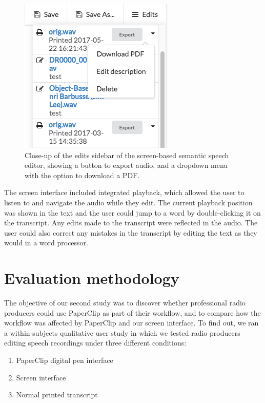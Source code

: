 \begin{figure}
  \centering
  \includegraphics[width=0.4\columnwidth]{figs/discourse-download-pdf.png}
  \caption[Close-up of the edits sidebar of the screen-based semantic speech editor.]{Close-up of the edits sidebar of
  the screen-based semantic speech editor, showing a button to export audio, and a dropdown menu with the option to
download a PDF.}
  \label{fig:download-pdf}
\end{figure}


The screen interface included integrated playback, which allowed the user to listen to and navigate the audio while
they edit. The current playback position was shown in the text and the user could jump to a word by double-clicking it
on the transcript. Any edits made to the transcript were reflected in the audio.  The user could also correct any
mistakes in the transcript by editing the text as they would in a word processor.









\section{Evaluation methodology}\label{sec:paper-method}

The objective of our second study was to discover whether professional radio producers could use PaperClip as part of
their workflow, and to compare how the workflow was affected by PaperClip and our screen interface.  To find out, we
ran a within-subjects qualitative user study in which we tested radio producers editing speech recordings under three
different conditions:

\begin{enumerate}[label=C\arabic*.]
  \item PaperClip digital pen interface
  \item Screen interface
  \item Normal printed transcript
\end{enumerate}

